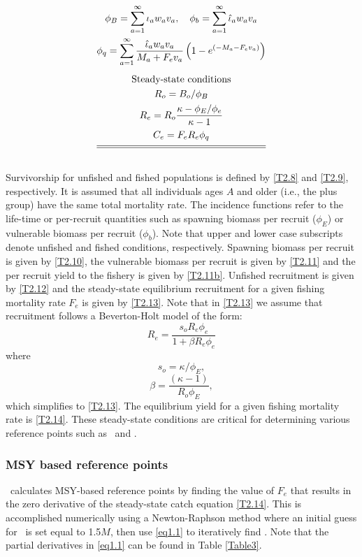 \begin{table}[!tbp]
\begin{gather}
            \phi_B=\sum_{a=1}^\infty \iota_a w_a v_a, \quad
            \phi_b=\sum_{a=1}^\infty \hat{\iota}_a w_a v_a \label{T2.11}\\
            \phi_q=\sum_{a=1}^\infty
                \frac{ \hat{\iota}_a w_a v_a}{M_a+F_ev_a}
                \left(1-e^{(-M_a-F_ev_a)}\right) \label{T2.11b} \\[1ex]
        \mbox{Steady-state conditions} \nonumber \\
        R_o=B_o/ \phi_B \label{T2.12}\\
        R_e=R_o\frac{\kappa-\phi_E/\phi_e}{\kappa-1} \label{T2.13}\\
        C_e=F_e R_e \phi_q\label{T2.14} \\[1ex]
        \hline \hline \nonumber
    \end{gather}
    \normalEq
\end{table}
Survivorship for unfished and fished populations is defined by \eqref{T2.8} and \eqref{T2.9}, respectively.  It is assumed that all individuals ages $A$ and older (i.e., the plus group) have the same total mortality rate.  The incidence functions refer to the life-time or per-recruit quantities such as spawning biomass per recruit ($\phi_E$) or vulnerable biomass per recruit ($\phi_b$).  Note that upper and lower case subscripts denote unfished and fished conditions, respectively.  Spawning biomass per recruit is given by \eqref{T2.10}, the vulnerable biomass per recruit is given by \eqref{T2.11} and the per recruit yield to the fishery is given by \eqref{T2.11b}.  Unfished recruitment is given by \eqref{T2.12} and the steady-state equilibrium recruitment  for a given fishing mortality rate $F_e$ is given by \eqref{T2.13}.  Note that in \eqref{T2.13} we assume that recruitment follows a Beverton-Holt model of the form:
\[
R_e=\frac{s_o R_e \phi_e}{1+\beta R_e \phi_e}
\]
where
\[
s_o = \kappa/\phi_E,
\]
\[
\beta = \frac{(\kappa-1)}{R_o\phi_E},
\]
which simplifies to \eqref{T2.13}.
The equilibrium yield for a given fishing mortality rate is \eqref{T2.14}.  These steady-state conditions are critical for determining various reference points such as \fmsy\ and \bmsy. 
	
\subsubsection{MSY based reference points}
\iscam\ calculates MSY-based reference points by finding the value of $F_e$ that results in the zero derivative of the steady-state catch equation \eqref{T2.14}.  This is accomplished numerically using a Newton-Raphson method where an initial guess for \fmsy\ is set equal to 1.5$M$, then use \eqref{eq1.1} to iteratively find \fmsy.  Note that the partial derivatives in \eqref{eq1.1} can be found in Table \ref{Table3}.

